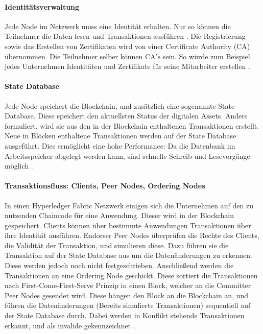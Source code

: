 \paragraph{Identitätsverwaltung}
Jede Node im Netzwerk muss eine Identität erhalten. Nur so können die Teilnehmer die Daten lesen und Transaktionen ausführen \cite{SchererPerformanceScalabilityBlockchain2017}. Die Registrierung sowie das Erstellen von Zertifikaten wird von einer Certificate Authority (CA) übernommen. Die Teilnehmer selber können CA's sein. So würde zum Beispiel jedes Unternehmen Identitäten und Zertifikate für seine Mitarbeiter erstellen \cite{HyperledgerFabricTeamCAHyperledgerFabric}.

\paragraph{State Database}
Jede Node speichert die Blockchain, und zusätzlich eine sogenannte State Database. Diese speichert den aktuellsten Status der digitalen Assets. Anders formuliert, wird sie aus den in der Blockchain enthaltenen Transaktionen erstellt. Neue in Blöcken enthaltene Transaktionen werden auf der State Database ausgeführt. Dies ermöglicht eine hohe Performance: Da die Datenbank im Arbeitsspeicher abgelegt werden kann, sind schnelle Schreib-und Lesevorgänge möglich \cite{SchererPerformanceScalabilityBlockchain2017}.

\paragraph{Transaktionsfluss: Clients, Peer Nodes, Ordering Nodes}
In einen Hyperledger Fabric Netzwerk einigen sich die Unternehmen auf den zu nutzenden Chaincode für eine Anwendung. Dieser wird in der Blockchain gespeichert. Clients können über bestimmte Anwendungen Transaktionen über ihre Identität ausführen. Endorser Peer Nodes überprüfen die Rechte des Clients, die Validität der Transaktion, und simulieren diese. Dazu führen sie die Transaktion auf der State Database aus um die Datenänderungen zu erkennen. Diese werden jedoch noch nicht festgeschrieben. Anschließend werden die Transaktionen an eine Ordering Node geschickt. Diese sortiert die Transaktionen nach First-Come-First-Serve Prinzip in einen Block, welcher an die Committer Peer Nodes gesendet wird. Diese hängen den Block an die Blockchain an, und führen die Datenänderungen (Bereits simulierte Transaktionen) sequentiell auf der State Database durch. Dabei werden in Konflikt stehende Transaktionen erkannt, und als invalide gekennzeichnet \cite{SchererPerformanceScalabilityBlockchain2017}.

